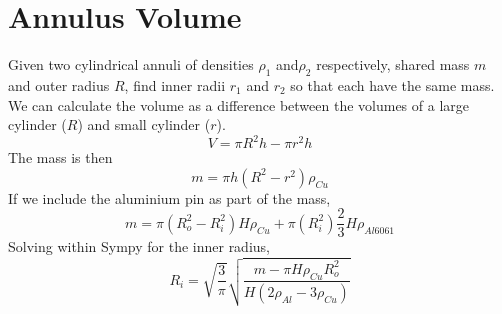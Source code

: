 \documentclass[10pt]{article}
\begin{document}
    \section{Annulus Volume}
    Given two cylindrical annuli of densities $\rho_1$ and$\rho_2$ respectively, shared mass $m$ and outer radius $R$, find inner radii $r_1$ and $r_2$ so that each have the same mass. 
    We can calculate the volume as a difference between the volumes of a large cylinder ($R$) and small cylinder ($r$).
    \begin{displaymath}
        V = \pi R^2h-\pi r^2h
    \end{displaymath}
    The mass is then
    \begin{displaymath}
        m = \pi h(R^2-r^2)\rho_{Cu}
    \end{displaymath}
    If we include the aluminium pin as part of the mass,
    \begin{displaymath}
        m = \pi (R_o^2-R_{i}^2)H\rho_{Cu}+\pi(R_i^2)\frac{2}{3}H\rho_{Al6061}
    \end{displaymath} 
    Solving within Sympy for the inner radius,
    \begin{displaymath}
        R_i = \sqrt{\frac{3}{\pi}}\sqrt{\frac{m-\pi H\rho_{Cu}R_o^2}{H(2\rho_{Al}-3\rho_{Cu})}}
    \end{displaymath}
\end{document}
